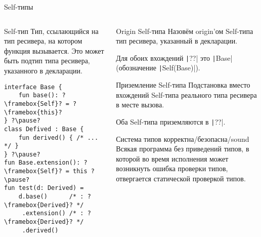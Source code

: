 \documentclass[handout,aspectratio=169,usenames,dvipsnames]{beamer}
\begin{document}
\begin{frame}[fragile]{Self-типы}
        \begin{columns}[onlytextwidth]
            \begin{column}{0.46\textwidth}
                \begin{block}{Self-тип}
                    Тип, ссылающийся на тип ресивера, на котором функция вызывается. Это может быть подтип типа ресивера, указанного в декларации.
                    \begin{verbatim}
interface Base {
    fun base(): ?\framebox{Self}? = ?\framebox{this}?
} ?\pause?
class Defived : Base {
    fun derived() { /* ... */ }
} ?\pause?
fun Base.extension(): ?\framebox{Self}? = this ?\pause?
fun test(d: Derived) =
    d.base()      /* : ?\framebox{Derived}? */
     .extension() /* : ?\framebox{Derived}? */
     .derived()
                    \end{verbatim}
                \end{block}
            \end{column}\hfill%
            \begin{column}{0.48\textwidth}
                \pause
                \begin{block}{Origin Self-типа}
                    Назовём origin'ом Self-типа тип ресивера, указанный в декларации.

                    \vspace{0em}
                    Для обоих вхождений \texttt|??| это \texttt|Base| (обозначение \texttt|Self(Base)|).
                \end{block}

                \pause
                \begin{block}{Приземление Self-типа}
                    Подстановка вместо вхождений Self-типа реального типа ресивера в месте вызова.

                    \vspace{0.0em}
                    Оба Self-типа приземляются в \texttt|??|.
                \end{block}

                \pause
                \begin{block}{Система типов корректна/безопасна/sound}
                    Всякая программа без приведений типов, в которой во время исполнения может возникнуть ошибка проверки типов, отвергается статической проверкой типов.
                \end{block}
            \end{column}
        \end{columns}
\end{frame}
\end{document}
